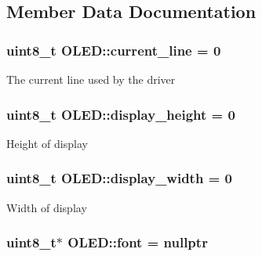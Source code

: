 \subsection{Member Data Documentation}
\hypertarget{class_o_l_e_d_aebd62601be5e2ceef6295721f17fc013}{
\subsubsection[{current\-\_\-line}]{\setlength{\rightskip}{0pt plus 5cm}uint8\-\_\-t O\-L\-E\-D\-::current\-\_\-line = 0\hspace{0.3cm}{\ttfamily [protected]}}}\label{class_o_l_e_d_aebd62601be5e2ceef6295721f17fc013}
The current line used by the driver \hypertarget{class_o_l_e_d_add08b51dec0ffeebcba7902c3bd4aeea}{
\subsubsection[{display\-\_\-height}]{\setlength{\rightskip}{0pt plus 5cm}uint8\-\_\-t O\-L\-E\-D\-::display\-\_\-height = 0\hspace{0.3cm}{\ttfamily [protected]}}}\label{class_o_l_e_d_add08b51dec0ffeebcba7902c3bd4aeea}
Height of display \hypertarget{class_o_l_e_d_a2e9305cb3341509bb62d61f33cae76fd}{
\subsubsection[{display\-\_\-width}]{\setlength{\rightskip}{0pt plus 5cm}uint8\-\_\-t O\-L\-E\-D\-::display\-\_\-width = 0\hspace{0.3cm}{\ttfamily [protected]}}}\label{class_o_l_e_d_a2e9305cb3341509bb62d61f33cae76fd}
Width of display \hypertarget{class_o_l_e_d_a29ab86a4a73f4d343bf1810927f0911d}{
\subsubsection[{font}]{\setlength{\rightskip}{0pt plus 5cm}uint8\-\_\-t$\ast$ O\-L\-E\-D\-::font = nullptr\hspace{0.3cm}{\ttfamily [protected]}}}\label{class_o_l_e_d_a29ab86a4a73f4d343bf1810927f0911d}
